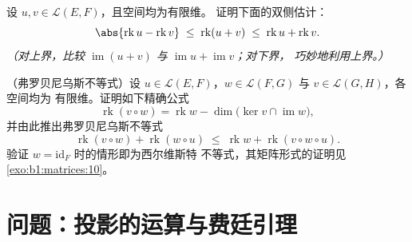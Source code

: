 \begin{exercise}[$\star\star$]\label{exo:b1:linmaps:11}
设 $u, v \in \mathcal{L}(E, F)$，且空间均为有限维。
证明下面的双侧估计：
\[
\abs{\operatorname{rk} u - \operatorname{rk} v}
\;\leq\; \operatorname{rk}(u + v)
\;\leq\; \operatorname{rk} u + \operatorname{rk} v .
\]
\emph{（对上界，比较 $\operatorname{im}(u+v)$ 与
$\operatorname{im} u + \operatorname{im} v$；对下界，
巧妙地利用上界。）}
\end{exercise}

\begin{exercise}[$\star\star\star$]\label{exo:b1:linmaps:12}
（弗罗贝尼乌斯不等式）设 $u \in \mathcal{L}(E, F)$，$w \in
\mathcal{L}(F, G)$ 与 $v \in \mathcal{L}(G, H)$，各空间均为
有限维。证明如下精确公式
\[
\operatorname{rk}(v \circ w) = \operatorname{rk} w -
\dim\bigl(\ker v \cap \operatorname{im} w\bigr),
\]
并由此推出弗罗贝尼乌斯不等式
\[
\operatorname{rk}(v \circ w) + \operatorname{rk}(w \circ u)
\;\leq\; \operatorname{rk} w + \operatorname{rk}(v \circ w \circ
u) .
\]
验证 $w = \mathrm{id}_F$ 时的情形即为西尔维斯特
不等式，其矩阵形式的证明见\cref{exo:b1:matrices:10}。
\end{exercise}

\section{问题：投影的运算与费廷引理}

